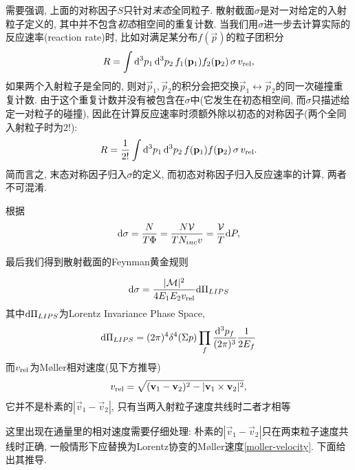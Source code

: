 需要强调, 上面的对称因子$S$只针对\emph{末态}全同粒子. 散射截面$\sigma$是对一对给定的入射粒子定义的, 其中并不包含\emph{初态}相空间的重复计数. 当我们用$\sigma$进一步去计算实际的反应速率(reaction rate)时, 比如对满足某分布$f(\vec p)$的粒子团积分
\begin{equation}
    R=\int\d^3p_1\,\d^3p_2\, f_1(\vec p_1) f_2(\vec p_2)\,\sigma\, v_{\rm{rel}},
\end{equation}
如果两个入射粒子是全同的, 则对$\vec p_1, \vec p_2$的积分会把交换$\vec p_1\leftrightarrow\vec p_2$的同一次碰撞重复计数. 由于这个重复计数并没有被包含在$\sigma$中(它发生在初态相空间, 而$\sigma$只描述给定一对粒子的碰撞), 因此在计算反应速率时须额外除以初态的对称因子(两个全同入射粒子时为$2!$):
\begin{equation}\label{reaction-rate-initial-symmetry}
    R=\frac1{2!}\int\d^3p_1\,\d^3p_2\, f(\vec p_1) f(\vec p_2)\,\sigma\, v_{\rm{rel}}.
\end{equation}
简而言之, 末态对称因子归入$\sigma$的定义, 而初态对称因子归入反应速率的计算, 两者不可混淆.

根据
\begin{equation}
    \d\sigma=\frac{N}{T\Phi}=\frac{N\mathcal V}{TN_{inc}v}=\frac{\mathcal V}{T}\d P,
\end{equation}

最后我们得到散射截面的Feynman黄金规则
\begin{theorem}[散射截面的Feynman黄金规则]
    \begin{equation}
        \d\sigma=\frac{|\mathcal M|^2}{4E_1E_2v_{\rm{rel}}}\d\Pi_{LIPS}
    \end{equation}
    其中$\d\Pi_{LIPS}$为Lorentz Invariance Phase Space,
    \begin{equation}
        \d\Pi_{LIPS}=\dpi4\delta^4(\Sigma p)\prod_{f}\ddd{p_f}\frac1{2E_f}
    \end{equation}
    而$v_{\rm{rel}}$为Møller相对速度(见下方推导)
    \begin{equation}\label{moller-velocity}
        v_{\rm{rel}}=\sqrt{(\vec v_1-\vec v_2)^2-|\vec v_1\times\vec v_2|^2},
    \end{equation}
    它并不是朴素的$|\vec v_1-\vec v_2|$, 只有当两入射粒子速度共线时二者才相等
\end{theorem}

这里出现在通量里的相对速度需要仔细处理: 朴素的$|\vec v_1-\vec v_2|$只在两束粒子速度共线时正确, 一般情形下应替换为Lorentz协变的Møller速度\eqref{moller-velocity}. 下面给出其推导.

